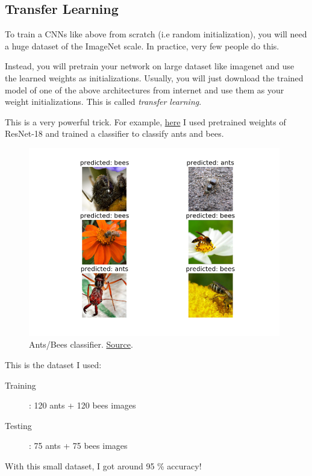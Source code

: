 \documentclass[a4paper]{tufte-handout}
\begin{document}
\subsection{Transfer Learning}\label{transfer-learning}

To train a CNNs like above from scratch (i.e random initialization), you
will need a huge dataset of the ImageNet scale. In practice, very few
people do this.

Instead, you will pretrain your network on large dataset like imagenet
and use the learned weights as initializations. Usually, you will just
download the trained model of one of the above architectures from
internet and use them as your weight initializations. This is called
\emph{transfer learning}.

This is a very powerful trick. For example,
\href{http://pytorch.org/tutorials/beginner/transfer_learning_tutorial.html}{here}
I used pretrained weights of ResNet-18 and trained a classifier to
classify ants and bees.

\begin{figure}
\includegraphics[width=110mm]{transfer_learning.png}
\caption{Ants/Bees classifier.
\href{http://pytorch.org/tutorials/beginner/transfer_learning_tutorial.html}{Source}.
}  
\end{figure}

This is the dataset I used:
\begin{description}
\item[Training]: 120 ants + 120 bees images
\item[Testing]: 75 ants + 75 bees images
\end{description}

With this small dataset, I got around 95 \% accuracy!
\end{document}
